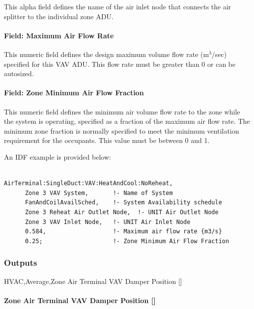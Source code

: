 This alpha field defines the name of the air inlet node that connects the air splitter to the individual zone ADU.

\paragraph{Field: Maximum Air Flow Rate}\label{field-maximum-air-flow-rate-5}

This numeric field defines the design maximum volume flow rate (m\(^{3}\)/sec) specified for this VAV ADU. This flow rate must be greater than 0 or can be autosized.

\paragraph{Field: Zone Minimum Air Flow Fraction}\label{field-zone-minimum-air-flow-fraction-2}

This numeric field defines the minimum air volume flow rate to the zone while the system is operating, specified as a fraction of the maximum air flow rate. The minimum zone fraction is normally specified to meet the minimum ventilation requirement for the occupants. This value must be between 0 and 1.

An IDF example is provided below:

\begin{lstlisting}

AirTerminal:SingleDuct:VAV:HeatAndCool:NoReheat,
      Zone 3 VAV System,       !- Name of System
      FanAndCoilAvailSched,    !- System Availability schedule
      Zone 3 Reheat Air Outlet Node,  !- UNIT Air Outlet Node
      Zone 3 VAV Inlet Node,   !- UNIT Air Inlet Node
      0.584,                   !- Maximum air flow rate {m3/s}
      0.25;                    !- Zone Minimum Air Flow Fraction
\end{lstlisting}

\subsubsection{Outputs}\label{outputs-6}

HVAC,Average,Zone Air Terminal VAV Damper Position {[]}

\paragraph{Zone Air Terminal VAV Damper Position {[]}}\label{zone-air-terminal-vav-damper-position-4}


